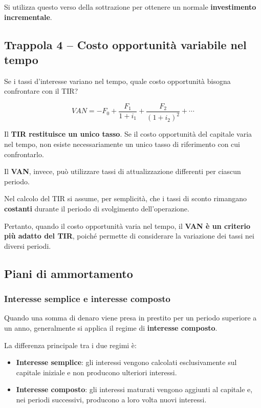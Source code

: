 \noindent Si utilizza questo verso della sottrazione per ottenere un normale \textbf{investimento incrementale}.

\subsection*{Trappola 4 -- Costo opportunità variabile nel tempo}

\noindent Se i tassi d'interesse variano nel tempo, quale costo opportunità bisogna confrontare con il TIR?

\[
VAN = -F_0 + \frac{F_1}{1+i_1}
+ \frac{F_2}{(1+i_2)^2} + \cdots
\]

\noindent Il \textbf{TIR restituisce un unico tasso}. Se il costo opportunità del capitale varia nel tempo, non esiste necessariamente un unico tasso di riferimento con cui confrontarlo.

\medskip

\noindent Il \textbf{VAN}, invece, può utilizzare tassi di attualizzazione differenti per ciascun periodo.

\medskip

\noindent Nel calcolo del TIR si assume, per semplicità, che i tassi di sconto rimangano \textbf{costanti} durante il periodo di svolgimento dell'operazione.

\medskip

\noindent Pertanto, quando il costo opportunità varia nel tempo, il \textbf{VAN è un criterio più adatto del TIR}, poiché permette di considerare la variazione dei tassi nei diversi periodi.

\subsection{Piani di ammortamento}

\subsubsection*{Interesse semplice e interesse composto}

\noindent Quando una somma di denaro viene presa in prestito per un periodo superiore a un anno, generalmente si applica il regime di \textbf{interesse composto}.

\medskip

\noindent La differenza principale tra i due regimi è:

\begin{itemize}
    \item \textbf{Interesse semplice}: gli interessi vengono calcolati esclusivamente sul capitale iniziale e non producono ulteriori interessi.

    \item \textbf{Interesse composto}: gli interessi maturati vengono aggiunti al capitale e, nei periodi successivi, producono a loro volta nuovi interessi.
\end{itemize}

